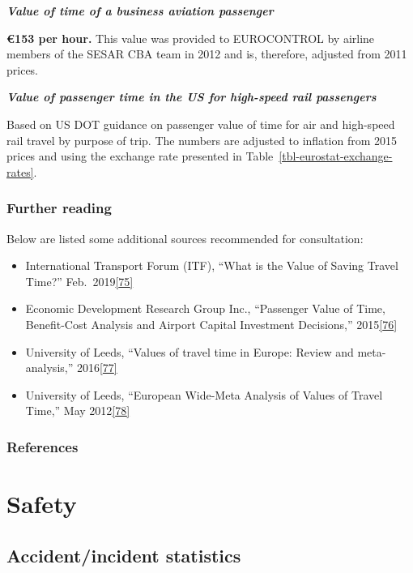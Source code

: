 \documentclass[
  11pt,
  a4paper,
]{book}
\begin{document}
\textbf{\emph{Value of time of a business aviation passenger}}

\textbf{€153 per hour.} This value was provided to EUROCONTROL by
airline members of the SESAR CBA team in 2012 and is, therefore,
adjusted from 2011 prices.

\textbf{\emph{Value of passenger time in the US for high-speed rail
passengers}}

Based on US DOT guidance on passenger value of time for air and
high-speed rail travel by purpose of trip. The numbers are adjusted to
inflation from 2015 prices and using the exchange rate presented in
Table~\ref{tbl-eurostat-exchange-rates}.

\hypertarget{further-reading-2}{%
\section{Further reading}\label{further-reading-2}}

Below are listed some additional sources recommended for consultation:

\begin{itemize}
\item
  International Transport Forum (ITF), ``What is the Value of Saving
  Travel Time?'' Feb.~2019\protect\hyperlink{ref-itf:2019}{{[}75{]}}
\item
  Economic Development Research Group Inc., ``Passenger Value of Time,
  Benefit-Cost Analysis and Airport Capital Investment Decisions,''
  2015\protect\hyperlink{ref-passtimevalue2015}{{[}76{]}}
\item
  University of Leeds, ``Values of travel time in Europe: Review and
  meta-analysis,''
  2016\protect\hyperlink{ref-leedsuniversity2016}{{[}77{]}}
\item
  University of Leeds, ``European Wide-Meta Analysis of Values of Travel
  Time,'' May 2012\protect\hyperlink{ref-leedsuniversity2012}{{[}78{]}}
\end{itemize}

\hypertarget{references-36}{%
\section{References}\label{references-36}}

\part{Safety}

\hypertarget{sec-accident-incident-statistics}{%
\chapter{Accident/incident
statistics}\label{sec-accident-incident-statistics}}
\end{document}
